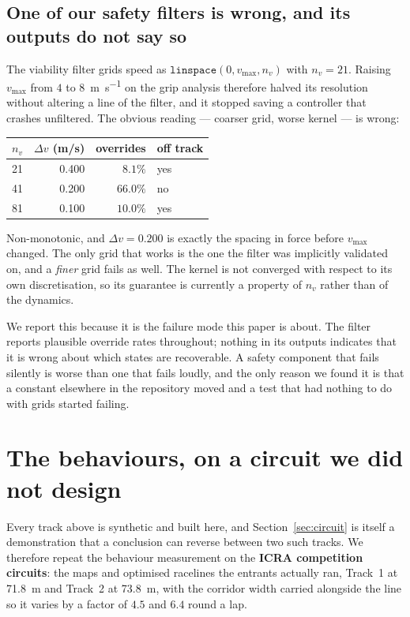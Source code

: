 \documentclass[letterpaper, 10 pt, conference]{ieeeconf}
\begin{document}
\subsection{One of our safety filters is wrong, and its outputs do not say so}\label{sec:viability}
The viability filter grids speed as $\texttt{linspace}(0, v_{\max}, n_v)$ with
$n_v = 21$. Raising $v_{\max}$ from $4$ to \SI{8}{\meter\per\second} on the
grip analysis therefore halved its resolution without altering a line of the
filter, and it stopped saving a controller that crashes unfiltered. The obvious
reading --- coarser grid, worse kernel --- is wrong:

\begin{center}
\begin{tabular}{rrrl}
  \toprule
  $n_v$ & $\Delta v$ (m/s) & overrides & off track \\
  \midrule
  21 & 0.400 & $8.1\%$  & yes \\
  41 & 0.200 & $66.0\%$ & no  \\
  81 & 0.100 & $10.0\%$ & yes \\
  \bottomrule
\end{tabular}
\end{center}

Non-monotonic, and $\Delta v = 0.200$ is exactly the spacing in force before
$v_{\max}$ changed. The only grid that works is the one the filter was
implicitly validated on, and a \emph{finer} grid fails as well. The kernel is
not converged with respect to its own discretisation, so its guarantee is
currently a property of $n_v$ rather than of the dynamics.

We report this because it is the failure mode this paper is about. The filter
reports plausible override rates throughout; nothing in its outputs indicates
that it is wrong about which states are recoverable. A safety component that
fails silently is worse than one that fails loudly, and the only reason we
found it is that a constant elsewhere in the repository moved and a test that
had nothing to do with grids started failing.


\section{The behaviours, on a circuit we did not design}\label{sec:behaviour}

Every track above is synthetic and built here, and Section~\ref{sec:circuit} is
itself a demonstration that a conclusion can reverse between two such tracks. We
therefore repeat the behaviour measurement on the \textbf{ICRA competition
circuits}: the maps and optimised racelines the entrants actually ran, Track~1
at \SI{71.8}{\meter} and Track~2 at \SI{73.8}{\meter}, with the corridor width
carried alongside the line so it varies by a factor of $4.5$ and $6.4$ round a
lap.
\end{document}
